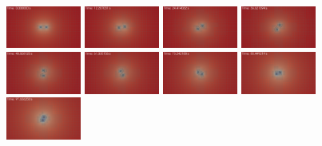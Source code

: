\begin{figure}[H]
	\centering
	\includegraphics[width=0.22\textwidth]{figs/paraview/r1/new/img_slice_level_000000.png}
	\includegraphics[width=0.22\textwidth]{figs/paraview/r1/new/img_slice_level_000100.png}
	\includegraphics[width=0.22\textwidth]{figs/paraview/r1/new/img_slice_level_000200.png}
	\includegraphics[width=0.22\textwidth]{figs/paraview/r1/new/img_slice_level_000300.png}
	\hfill
	\includegraphics[width=0.22\textwidth]{figs/paraview/r1/new/img_slice_level_000400.png}	
	\includegraphics[width=0.22\textwidth]{figs/paraview/r1/new/img_slice_level_000500.png}	
	\includegraphics[width=0.22\textwidth]{figs/paraview/r1/new/img_slice_level_000600.png}	
	\includegraphics[width=0.22\textwidth]{figs/paraview/r1/new/img_slice_level_000700.png}	
	\hfil
	\includegraphics[width=0.22\textwidth]{figs/paraview/r1/new/img_slice_level_000800.png}	

\end{figure}
